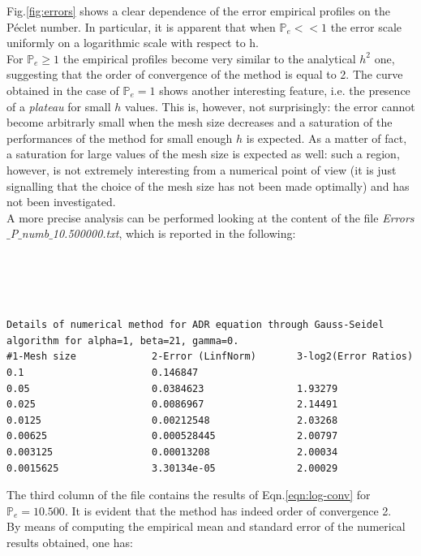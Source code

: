 \documentclass[11pt]{article}
\theoremstyle{theorem}
\theoremstyle{definition}
\begin{document}
Fig.\ref{fig:errors} shows a clear dependence of the error empirical profiles on the P\'{e}clet number. In particular, it is apparent that when $\mathbb{P}_e<<1$ the error scale uniformly on a logarithmic scale with respect to h.\\
For $\mathbb{P}_e\ge 1$ the empirical profiles become very similar to the analytical $h^2$ one, suggesting that the order of convergence of the method is equal to 2. The curve obtained in the case of $\mathbb{P}_e=1$ shows another interesting feature, i.e. the presence of a \emph{plateau} for small $h$ values. This is, however, not surprisingly: the error cannot become arbitrarly small when the mesh size decreases and a saturation of the performances of the method for small enough $h$ is expected. As a matter of fact, a saturation for large values of the mesh size is expected as well: such a region, however, is not extremely interesting from a numerical point of view (it is just signalling that the choice of the mesh size has not been made optimally) and has not been investigated.\\
A more precise analysis can be performed looking at the content of the file \emph{Errors$\_$P$\_$numb$\_$10.500000.txt}, which is reported in the following:
\\
\\
\\
\\
\\

  
\begin{lstlisting}
Details of numerical method for ADR equation through Gauss-Seidel algorithm for alpha=1, beta=21, gamma=0.
#1-Mesh size             2-Error (LinfNorm)       3-log2(Error Ratios)     
0.1                      0.146847                 	                        
0.05                     0.0384623                1.93279                  
0.025                    0.0086967                2.14491                  
0.0125                   0.00212548               2.03268                  
0.00625                  0.000528445              2.00797                  
0.003125                 0.00013208               2.00034                  
0.0015625                3.30134e-05              2.00029 
\end{lstlisting}


The third column of the file contains the results of Eqn.\eqref{eqn:log-conv} for $\mathbb{P}_e=10.500$. It is evident that the method has indeed order of convergence 2.\\
By means of computing the empirical mean and standard error of the numerical results obtained, one has:
\end{document}
